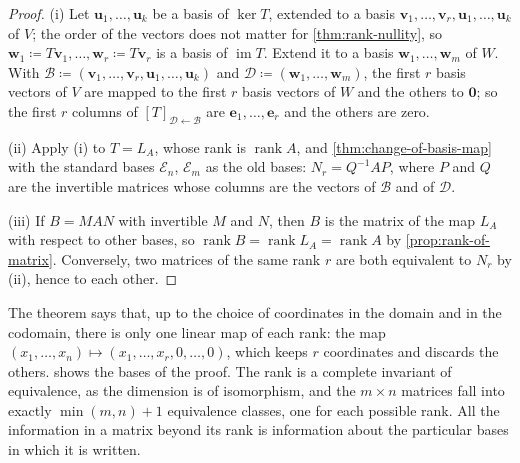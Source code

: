 \begin{proof}
(i) Let $\mathbf u_1,\ldots,\mathbf u_k$ be a basis of $\ker T$, extended to a basis $\mathbf v_1,\ldots,\mathbf v_r,\mathbf u_1,\ldots,\mathbf u_k$ of $V$; the order of the vectors does not matter for \cref{thm:rank-nullity}, so $\mathbf w_1\coloneqq T\mathbf v_1,\ldots,\mathbf w_r\coloneqq T\mathbf v_r$ is a basis of $\operatorname{im}T$. Extend it to a basis $\mathbf w_1,\ldots,\mathbf w_m$ of $W$. With $\mathcal B\coloneqq(\mathbf v_1,\ldots,\mathbf v_r,\allowbreak\mathbf u_1,\ldots,\mathbf u_k)$ and $\mathcal D\coloneqq(\mathbf w_1,\ldots,\mathbf w_m)$, the first $r$ basis vectors of $V$ are mapped to the first $r$ basis vectors of $W$ and the others to $\mathbf 0$; so the first $r$ columns of $[T]_{\mathcal D\leftarrow\mathcal B}$ are $\mathbf e_1,\ldots,\mathbf e_r$ and the others are zero.

(ii) Apply (i) to $T=L_A$, whose rank is $\operatorname{rank}A$, and \cref{thm:change-of-basis-map} with the standard bases $\mathcal E_n$, $\mathcal E_m$ as the old bases: $N_r=Q^{-1}AP$, where $P$ and $Q$ are the invertible matrices whose columns are the vectors of $\mathcal B$ and of $\mathcal D$.

(iii) If $B=MAN$ with invertible $M$ and $N$, then $B$ is the matrix of the map $L_A$ with respect to other bases, so $\operatorname{rank}B=\operatorname{rank}L_A=\operatorname{rank}A$ by \cref{prop:rank-of-matrix}. Conversely, two matrices of the same rank $r$ are both equivalent to $N_r$ by (ii), hence to each other.
\end{proof}

The theorem says that, up to the choice of coordinates in the domain and in the codomain, there is only one linear map of each rank: the map $(x_1,\ldots,x_n)\mapsto(x_1,\ldots,x_r,0,\ldots,0)$, which keeps $r$ coordinates and discards the others.  shows the bases of the proof. The rank is a complete invariant of equivalence, as the dimension is of isomorphism, and the $m\times n$ matrices fall into exactly $\min(m,n)+1$ equivalence classes, one for each possible rank. All the information in a matrix beyond its rank is information about the particular bases in which it is written.

